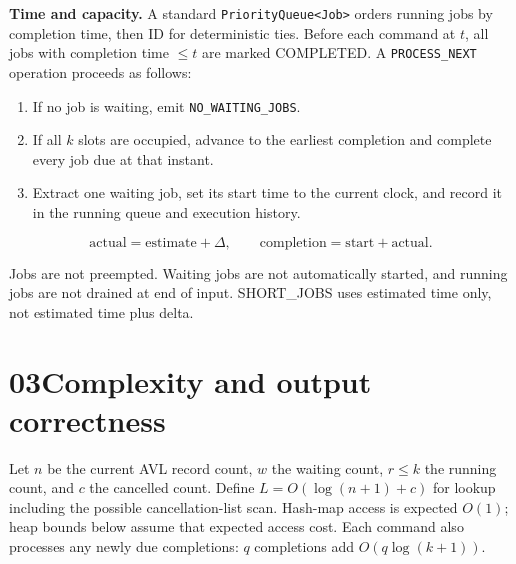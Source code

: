 \documentclass[10pt,letterpaper]{article}
\newcommand{\code}[1]{\texttt{#1}}
\newcommand{\sectiontitle}[2]{\section*{\textcolor{accent}{#1}\quad #2}}
\begin{document}
\textbf{Time and capacity.} A standard \code{PriorityQueue<Job>} orders running jobs by completion time, then ID for deterministic ties. Before each command at $t$, all jobs with completion time $\leq t$ are marked COMPLETED. A \code{PROCESS\_NEXT} operation proceeds as follows:
\begin{enumerate}
\item If no job is waiting, emit \code{NO\_WAITING\_JOBS}.
\item If all $k$ slots are occupied, advance to the earliest completion and complete every job due at that instant.
\item Extract one waiting job, set its start time to the current clock, and record it in the running queue and execution history.
\end{enumerate}
\[
\text{actual}=\text{estimate}+\Delta,\qquad
\text{completion}=\text{start}+\text{actual}.
\]
\begin{center}
\end{center}
Jobs are not preempted. Waiting jobs are not automatically started, and running jobs are not drained at end of input. SHORT\_JOBS uses estimated time only, not estimated time plus delta.

\newpage
\sectiontitle{03}{Complexity and output correctness}
Let $n$ be the current AVL record count, $w$ the waiting count, $r\leq k$ the running count, and $c$ the cancelled count. Define $L=O(\log(n+1)+c)$ for lookup including the possible cancellation-list scan. Hash-map access is expected $O(1)$; heap bounds below assume that expected access cost. Each command also processes any newly due completions: $q$ completions add $O(q\log(k+1))$.
\end{document}
